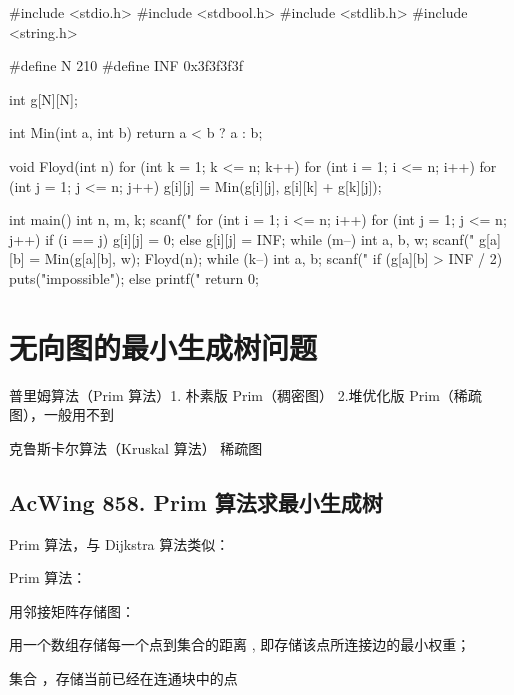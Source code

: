 \begin{mycpptwocol}[Floyd]
    #include <stdio.h>
    #include <stdbool.h>
    #include <stdlib.h>
    #include <string.h>

    #define N 210
    #define INF 0x3f3f3f3f

    int g[N][N];

    int Min(int a, int b) {
        return a < b ? a : b;
    }

    void Floyd(int n) {
        for (int k = 1; k <= n; k++) {
            for (int i = 1; i <= n; i++) {
                for (int j = 1; j <= n; j++) {
                    g[i][j] = Min(g[i][j], g[i][k] + g[k][j]);
                }
            }
        }
    }

    int main() {
        int n, m, k;
        scanf("%
        for (int i = 1; i <= n; i++) {
            for (int j = 1; j <= n; j++) {
                if (i == j) {
                    g[i][j] = 0;
                } else {
                    g[i][j] = INF;
                }
            }
        }
        while (m--) {
            int a, b, w;
            scanf("%
            g[a][b] = Min(g[a][b], w);
        }
        Floyd(n);
        while (k--) {
            int a, b;
            scanf("%
            if (g[a][b] > INF / 2) {
                puts("impossible");
            } else {
                printf("%
            }
        }
        return 0;
    }
\end{mycpptwocol}


\section{无向图的最小生成树问题}

\begin{myenum}
    \item 普里姆算法（Prim 算法）1. 朴素版 Prim（稠密图） 2.堆优化版 Prim（稀疏图），一般用不到
    \item 克鲁斯卡尔算法（Kruskal 算法） 稀疏图
\end{myenum}

\subsection{AcWing 858. Prim 算法求最小生成树}
Prim 算法，与 Dijkstra 算法类似：

Prim 算法：

\begin{myenum}
    \item 用邻接矩阵存储图：
    \item 用一个数组存储每一个点到集合的距离 , 即存储该点所连接边的最小权重；
    \item 集合 ，存储当前已经在连通块中的点
\end{myenum}

